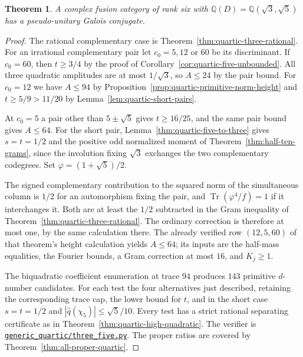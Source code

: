 \documentclass[11pt,reqno]{amsart}
\newcommand{\codefile}[1]{\href{https://github.com/sebastienpalcoux/grothendieck-ring-classification/blob/d5750105bb5758f3ad38d2e5464dfcc12c019816/supplements/rank6/sphericality/#1}{\nolinkurl{#1}}}
\newtheorem{theorem}{Theorem}[section]
\theoremstyle{remark}\newtheorem{remark}[theorem]{Remark}
\numberwithin{equation}{section}
\begin{document}
\begin{theorem}\label{thm:quartic-three-five}
A complex fusion category of rank six with $\mathbb Q(D)=\mathbb Q(\sqrt3,\sqrt5)$ has a pseudo-unitary Galois conjugate.
\end{theorem}
\begin{proof}
The rational complementary case is Theorem~\ref{thm:quartic-three-rational}. For an irrational complementary pair let $c_0=5,12$ or $60$ be its discriminant. If $c_0=60$, then $t\ge3/4$ by the proof of Corollary~\ref{cor:quartic-five-unbounded}. All three quadratic amplitudes are at most $1/\sqrt3$, so $A\le24$ by the pair bound. For $c_0=12$ we have $A\le94$ by Proposition~\ref{prop:quartic-primitive-norm-height} and $t\ge5/9>11/20$ by Lemma~\ref{lem:quartic-short-pairs}.

At $c_0=5$ a pair other than $5\pm\sqrt5$ gives $t\ge16/25$, and the same pair bound gives $A\le64$. For the short pair, Lemma~\ref{thm:quartic-five-to-three} gives
$s=t=1/2$ and the positive odd normalized moment of
Theorem~\ref{thm:half-ten-grams}, since the involution fixing
$\sqrt3$ exchanges the two complementary codegrees. Set
$\varphi=(1+\sqrt5)/2$.

The signed complementary contribution to the squared norm of the simultaneous column is $1/2$ for an automorphism fixing the pair, and $\operatorname{Tr}(\varphi^4/f)=1$ if it interchanges it. Both are at least the $1/2$ subtracted in the Gram inequality of Theorem~\ref{thm:quartic-three-rational}. The ordinary correction is therefore at most one, by the same calculation there. The already verified row $(12,5,60)$ of that theorem's height calculation yields $A\le64$; its inputs are the half-mass equalities, the Fourier bounds, a Gram correction at most $16$, and $K_j\ge1$.

The biquadratic coefficient enumeration at trace $94$ produces $143$ primitive $d$-number candidates. For each test the four alternatives just described, retaining the corresponding trace cap, the lower bound for $t$, and in the short case $s=t=1/2$ and $|\widehat q(\chi_5)|\le\sqrt5/10$. Every test has a strict rational separating certificate as in Theorem~\ref{thm:quartic-high-quadratic}. The verifier is \codefile{generic_quartic/three_five.py}. The proper ratios are covered by Theorem~\ref{thm:all-proper-quartic}.
\end{proof}
\end{document}
